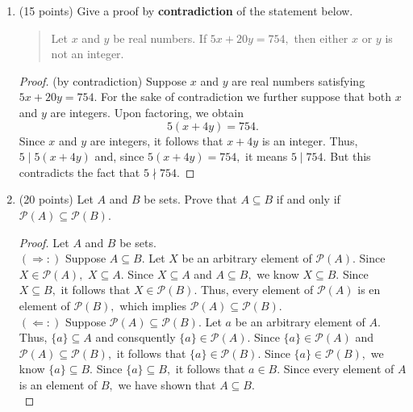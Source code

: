 \documentclass[11pt]{article}
\newcommand{\Z}{{\mathbb{Z}}}
\begin{document}
\begin{enumerate}
\begin{proof}
\textbf{Case 2:} $b$ is even\\
Since $b$ is even, there exists an integer $k$ such that $b=2k.$ Thus, 
\begin{align*}
(a+1)(6a+b)& = (a+1)(6a+2k)& \text{ by substituting } b=2k\\
&=2(a+1)(6a+k)& \text{ by factoring}\\
&=2\ell,&\\
\end{align*}
where $\ell=(a+1)(6a+k) \in \Z.$ Thus, by the definition of even, $(a+1)(6a+b)$ is even.\\

Thus, in all cases, $(a+1)(6a+b)$ is even.\\
\end{proof}
\vfill
\newpage
\item (15 points) Give a proof by \textbf{contradiction} of the statement below.
\begin{quote} Let $x$ and $y$ be real numbers. If $5x + 20y=754,$ then either $x$ or $y$ is not an integer. \end{quote}

\begin{proof} (by contradiction) Suppose $x$ and $y$ are real numbers satisfying $5x + 20y=754.$ For the sake of contradiction we further suppose that both $x$ and $y$ are integers. Upon factoring, we obtain 
$$5(x+4y)=754.$$
Since $x$ and $y$ are integers, it follows that $x+4y$ is an integer. Thus, $5 \mid 5(x+4y)$ and, since $5(x+4y)=754,$ it means $5 \mid 754.$ But this contradicts the fact that $5 \nmid 754.$
\end{proof} 
\vfill
\item (20 points) Let $A$ and $B$ be sets. Prove that $A \subseteq B$ if and only if $\mathcal{P}(A) \subseteq \mathcal{P}(B).$

\begin{proof} Let $A$ and $B$ be sets. \\

$(\Rightarrow:)$ Suppose  $A \subseteq B.$ Let $X$ be an arbitrary element of  $\mathcal{P}(A).$ Since $X \in \mathcal{P}(A),$ $X \subseteq A.$ Since $X \subseteq A$ and $A \subseteq B,$ we know $X \subseteq B.$ Since $X \subseteq B,$ it follows that $X \in \mathcal{P}(B).$ Thus, every element of $\mathcal{P}(A)$ is en element of $\mathcal{P}(B),$ which implies $\mathcal{P}(A) \subseteq \mathcal{P}(B).$\\

$(\Leftarrow:)$ Suppose $\mathcal{P}(A) \subseteq \mathcal{P}(B).$ Let $a$ be an arbitrary element of $A.$ Thus, $\{ a \} \subseteq A$ and consquently $\{a \} \in \mathcal{P}(A).$ Since $\{a \} \in \mathcal{P}(A)$ and $\mathcal{P}(A) \subseteq \mathcal{P}(B),$ it follows that $\{a \} \in \mathcal{P}(B)$. Since $\{a \} \in \mathcal{P}(B),$ we know $\{a \} \subseteq B.$ Since $\{a \} \subseteq B,$ it follows that $a \in B.$ Since every element of $A$ is an element of $B,$ we have shown that $A \subseteq B.$\\


\end{proof}
\end{enumerate}
\end{document}

